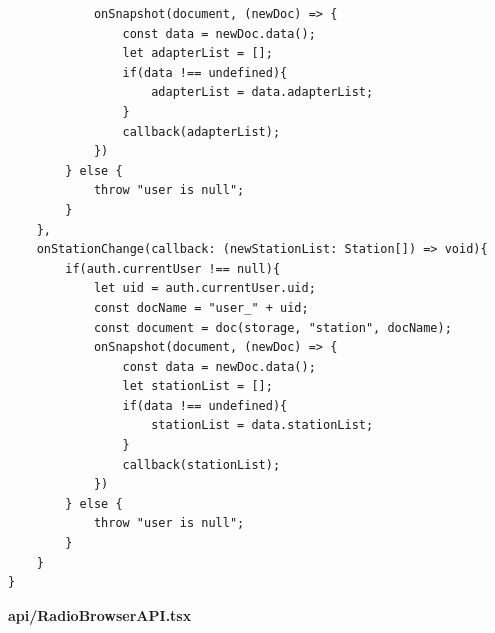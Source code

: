 \documentclass[11pt, twoside]{article}
\begin{document}
\begin{lstlisting}
            onSnapshot(document, (newDoc) => {
                const data = newDoc.data();
                let adapterList = [];
                if(data !== undefined){
                    adapterList = data.adapterList;
                }
                callback(adapterList);
            })
        } else {
            throw "user is null";
        }
    },
    onStationChange(callback: (newStationList: Station[]) => void){
        if(auth.currentUser !== null){
            let uid = auth.currentUser.uid;
            const docName = "user_" + uid;
            const document = doc(storage, "station", docName);
            onSnapshot(document, (newDoc) => {
                const data = newDoc.data();
                let stationList = [];
                if(data !== undefined){
                    stationList = data.stationList;
                }
                callback(stationList);
            })
        } else {
            throw "user is null";
        }
    }
}
\end{lstlisting}
\textbf{api/RadioBrowserAPI.tsx}
\end{document}
